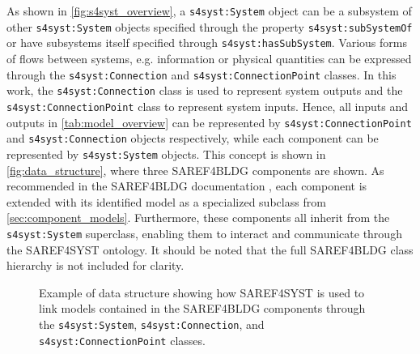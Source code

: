 As shown in \autoref{fig:s4syst_overview}, a \texttt{s4syst:System} object can be a subsystem of other \texttt{s4syst:System} objects specified through the property \texttt{s4syst:subSystemOf} or have subsystems itself specified through \texttt{s4syst:hasSubSystem}. Various forms of flows between systems, e.g. information or physical quantities can be expressed through the \texttt{s4syst:Connection} and \texttt{s4syst:ConnectionPoint} classes. In this work, the \texttt{s4syst:Connection} class is used to represent system outputs and the \texttt{s4syst:ConnectionPoint} class to represent system inputs. Hence, all inputs and outputs in \autoref{tab:model_overview} can be represented by \texttt{s4syst:ConnectionPoint} and \texttt{s4syst:Connection} objects respectively, while each component can be represented by \texttt{s4syst:System} objects. This concept is shown in \autoref{fig:data_structure}, where three SAREF4BLDG components are shown. As recommended in the SAREF4BLDG documentation \cite{ETSI_s4bldg}, each component is extended with its identified model as a specialized subclass from \autoref{sec:component_models}. Furthermore, these components all inherit from the \texttt{s4syst:System} superclass, enabling them to interact and communicate through the SAREF4SYST ontology. It should be noted that the full SAREF4BLDG class hierarchy is not included for clarity. 


\begin{figure}[!h]
    \centering
    
    \caption{Example of data structure showing how SAREF4SYST is used to link models contained in the SAREF4BLDG components through the \texttt{s4syst:System}, \texttt{s4syst:Connection}, and \texttt{s4syst:ConnectionPoint} classes.}
    \label{fig:data_structure}
\end{figure}



